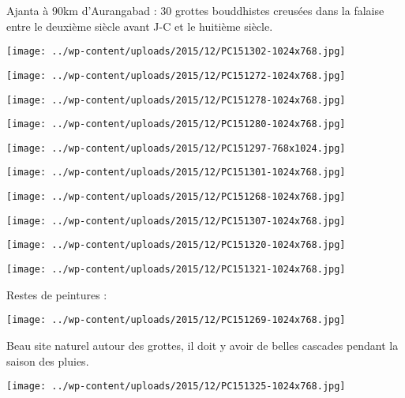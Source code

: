 Ajanta à 90km d'Aurangabad : 30 grottes bouddhistes creusées dans la falaise entre le deuxième siècle avant J-C et le huitième siècle.
\begin{center} \texttt{[image: ../wp-content/uploads/2015/12/PC151302-1024x768.jpg]} \end{center}
\begin{center} \texttt{[image: ../wp-content/uploads/2015/12/PC151272-1024x768.jpg]} \end{center}
\begin{center} \texttt{[image: ../wp-content/uploads/2015/12/PC151278-1024x768.jpg]} \end{center}
\begin{center} \texttt{[image: ../wp-content/uploads/2015/12/PC151280-1024x768.jpg]} \end{center}
\begin{center} \texttt{[image: ../wp-content/uploads/2015/12/PC151297-768x1024.jpg]} \end{center}
\begin{center} \texttt{[image: ../wp-content/uploads/2015/12/PC151301-1024x768.jpg]} \end{center}
\begin{center} \texttt{[image: ../wp-content/uploads/2015/12/PC151268-1024x768.jpg]} \end{center}
\begin{center} \texttt{[image: ../wp-content/uploads/2015/12/PC151307-1024x768.jpg]} \end{center}
\begin{center} \texttt{[image: ../wp-content/uploads/2015/12/PC151320-1024x768.jpg]} \end{center}
\begin{center} \texttt{[image: ../wp-content/uploads/2015/12/PC151321-1024x768.jpg]} \end{center}
\pagebreak

Restes de peintures :
\begin{center} \texttt{[image: ../wp-content/uploads/2015/12/PC151269-1024x768.jpg]} \end{center}

Beau site naturel autour des grottes, il doit y avoir de belles cascades pendant la saison des pluies. 
\begin{center} \texttt{[image: ../wp-content/uploads/2015/12/PC151325-1024x768.jpg]} \end{center}
\pagebreak

